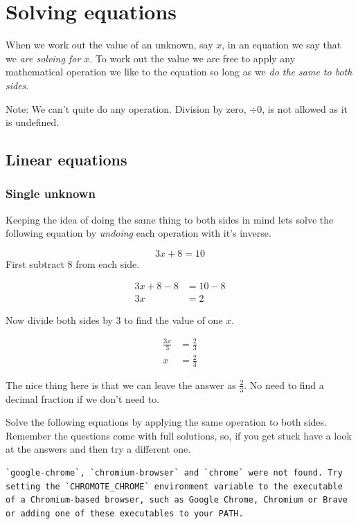 \documentclass[
  a4paper,
]{scrbook}
\begin{document}

\chapter{Solving equations}\label{solving-equations}

When we work out the value of an unknown, say \(x\), in an equation we
say that we \emph{are solving for \(x\)}. To work out the value we are
free to apply any mathematical operation we like to the equation so long
as we \emph{do the same to both sides}.

Note: We can't quite do any operation. Division by zero, \(\div 0\), is
not allowed as it is undefined.

\section{Linear equations}\label{linear-equations}

\subsection{Single unknown}\label{single-unknown}

Keeping the idea of doing the same thing to both sides in mind lets
solve the following equation by \emph{undoing} each operation with it's
inverse.

\[
3x + 8 = 10
\] First subtract \(8\) from each side.

\[
\begin{aligned} 3x+8 -8 &= 10 -8 \\
3x &= 2
\end{aligned}
\]

Now divide both sides by \(3\) to find the value of one \(x\).

\[
\begin{aligned} \frac{3x}{3} &= \frac{2}{3} \\
x &= \frac{2}{3}
\end{aligned}
\]

The nice thing here is that we can leave the answer as \(\frac{2}{3}\).
No need to find a decimal fraction if we don't need to.

Solve the following equations by applying the same operation to both
sides. Remember the questions come with full solutions, so, if you get
stuck have a look at the answers and then try a different one.

\begin{verbatim}
`google-chrome`, `chromium-browser` and `chrome` were not found. Try setting the `CHROMOTE_CHROME` environment variable to the executable of a Chromium-based browser, such as Google Chrome, Chromium or Brave or adding one of these executables to your PATH.
\end{verbatim}
\end{document}
